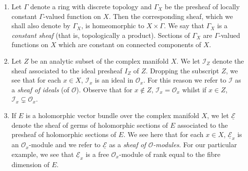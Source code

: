 \begin{enumerate}[start=9]
We remark the important fact that a continuous local section of $\mathcal C_X^k$ (resp. $\mathcal D_X$, $\mathcal O_X$) over an open subset $U$ corresponds to a unique $C^k$ (resp. $C^\infty$, analytic) function on $U$. The proof is the same as for $\mathcal C_X$.
Finally, we observe that $\mathcal O_X$ is an open subset of $\mathcal D_X$ and that each stalk $\mathcal O_x$ is a subring of $\mathcal D_x$. We say that $\mathcal O_X$ is a \emph{subsheaf} (of rings) of $\mathcal D_X$. Generally, if $(\mathcal R,\pi,X)$ and $(\mathcal S,\eta,X)$ are sheaves of rings on $X$, we say that $\mathcal R$ is a \emph{subsheaf} (of rings) of $\mathcal S$ if $\mathcal R$ is an open subset of $\mathcal S$, $\eta|\mathcal R=\pi$ and for all $x\in X$, $\mathcal R_x$ is a subring of $\mathcal S_x$. Thus all the sheaves constructed above are subsheaves of $\mathcal C_X$. The reader may care to formulate the analogous concept of \emph{subpresheaf}.
\item Let $\Gamma$ denote a ring with discrete topology and $\Gamma_X$ be the presheaf of locally constant $\Gamma$-valued function on $X$. Then the corresponding sheaf, which we shall also denote by $\Gamma_X$, is homeomorphic to $X\times\Gamma$. We say that $\Gamma_X$ is a \emph{constant sheaf} (that is, topologically a product). Sections of $\Gamma_X$ are $\Gamma$-valued functions on $X$ which are constant on connected components of $X$.
\item Let $Z$ be an analytic subset of the complex manifold $X$. We let $\mathcal I_Z$ denote the sheaf associated to the ideal presheaf $I_Z$ of $Z$. Dropping the subscript $Z$, we see that for each $x\in X$, $\mathcal I_x$ is an ideal in $\mathcal O_x$. For this reason we refer to $\mathcal I$ as a \emph{sheaf of ideals} (of $\mathcal O$). Observe that for $x\notin Z$, $\mathcal I_x=\mathcal O_x$ whilst if $x\in Z$, $\mathcal I_x\subsetneq\mathcal O_x$.
\item If $E$ is a holomorphic vector bundle over the complex manifold $X$, we let $\underline{\mathcal E}$ denote the sheaf of germs of holomorphic sections of $E$ associated to the presheaf of holomorphic sections of $E$. We see here that for each $x\in X$, $\underline{\mathcal E}_x$ is an $\mathcal O_x$-module and we refer to $\underline{\mathcal E}$ as a \emph{sheaf of $\mathcal O$-modules}. For our particular example, we see that $\underline{\mathcal E}_x$ is a free $\mathcal O_x$-module of rank equal to the fibre dimension of $E$.

\end{enumerate}
